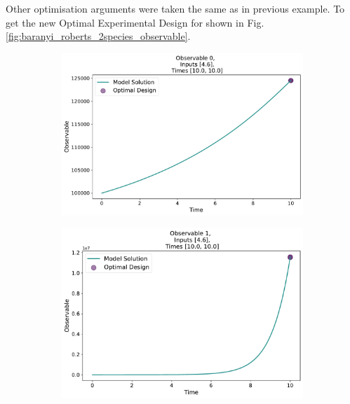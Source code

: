 \documentclass[10pt,A4paper]{article}
\begin{document}
Other optimisation arguments were taken the same as in previous example.
To get the new Optimal Experimental Design for shown in Fig. \ref{fig:baranyi_roberts_2species_observable}.
\begin{figure}[H]
    \begin{subfigure}{.5\textwidth}
        \centering
        \includegraphics[scale=0.27]{Figures/Observable_Results_baranyi_roberts_ode_fisher_determinant_2species_rel_sensit_cont_2times_2temps_000_x_00.pdf}
        \subcaption{}
      \end{subfigure}    
      \begin{subfigure}{.5\textwidth}
        \centering
        \includegraphics[scale=0.27]{Figures/Observable_Results_baranyi_roberts_ode_fisher_determinant_2species_rel_sensit_cont_2times_2temps_000_x_01.pdf}
    \subcaption{}  
    \end{subfigure}

\end{figure}
\end{document}
